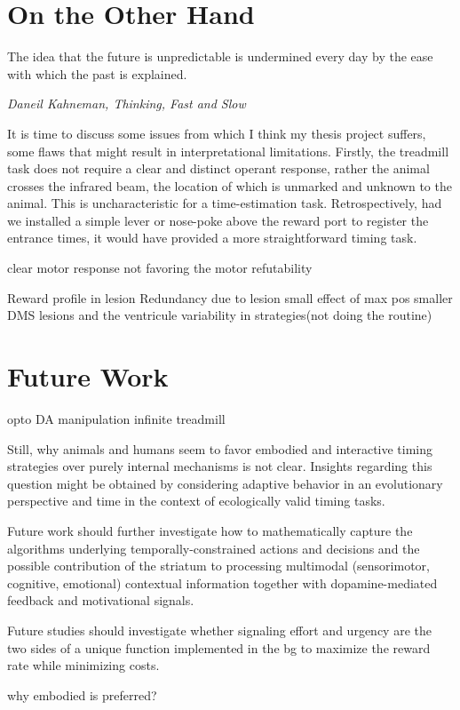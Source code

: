 \section{On the Other Hand}
\epigraph{The idea that the future is unpredictable is undermined every day by the ease with which the past is explained.}
{\textit{Daneil Kahneman, Thinking, Fast and Slow}}
\noindent
It is time to discuss some issues from which I think my thesis project suffers, some flaws that might result in interpretational limitations.
Firstly, the treadmill task does not require a clear and distinct operant response, rather the animal crosses the infrared beam, the location of which is unmarked and unknown to the animal.
This is uncharacteristic for a time-estimation task.
Retrospectively, had we installed a simple lever or nose-poke above the reward port to register the entrance times, it would have provided a more straightforward timing task.


clear motor response
not favoring the motor
refutability

Reward profile in lesion
Redundancy due to lesion
small effect of max pos
smaller DMS lesions and the ventricule
variability in strategies(not doing the routine)






\section{Future Work}

opto
DA manipulation
infinite treadmill

Still, why animals and humans seem to favor embodied and interactive timing strategies over purely internal mechanisms is not clear.
Insights regarding this question might be obtained by considering adaptive behavior in an evolutionary perspective\cite{Cisek2019} and time in the context of ecologically valid timing tasks\cite{vanRijn2018}.


Future work should further investigate how to mathematically capture the algorithms underlying temporally-constrained actions and decisions and the possible contribution of the striatum to processing multimodal (sensorimotor, cognitive, emotional) contextual information together with dopamine-mediated feedback and motivational signals.


Future studies should investigate whether signaling effort and urgency are the two sides of a unique function implemented in the \gls{bg} to maximize the reward rate while minimizing costs.




why embodied is preferred?